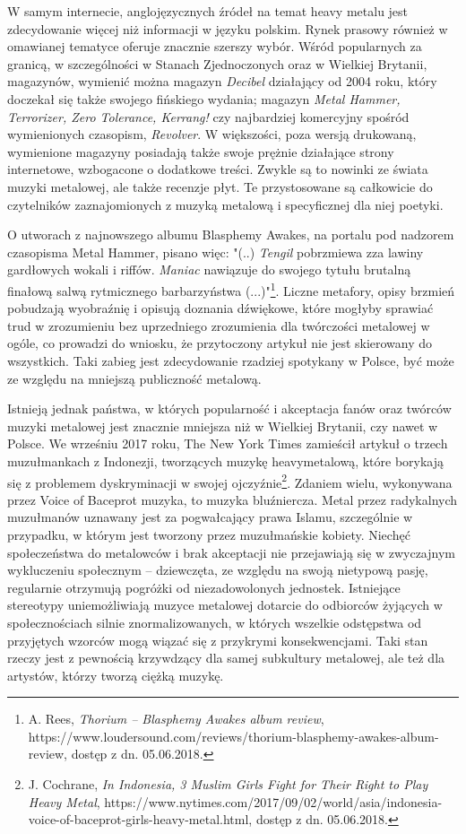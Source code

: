 \documentclass[12pt, a4paper, titlepage]{report}
\begin{document}
W samym internecie, anglojęzycznych źródeł na temat heavy metalu jest zdecydowanie więcej niż informacji w języku polskim. Rynek prasowy również w omawianej tematyce oferuje znacznie szerszy wybór. Wśród popularnych za granicą, w szczególności w Stanach Zjednoczonych oraz w Wielkiej Brytanii, magazynów, wymienić można magazyn \textit{Decibel} działający od 2004 roku, który doczekał się także swojego fińskiego wydania; magazyn \textit{Metal Hammer, Terrorizer, Zero Tolerance, Kerrang!} czy najbardziej komercyjny spośród wymienionych czasopism, \textit{Revolver}. W większości, poza wersją drukowaną, wymienione magazyny posiadają także swoje prężnie działające strony internetowe, wzbogacone o dodatkowe treści. Zwykle są to nowinki ze świata muzyki metalowej, ale także recenzje płyt. Te przystosowane są całkowicie do czytelników zaznajomionych z muzyką metalową i specyficznej dla niej poetyki. 

O utworach z najnowszego albumu Blasphemy Awakes, na portalu pod nadzorem czasopisma Metal Hammer, pisano więc: "(..) \textit{Tengil} pobrzmiewa zza lawiny gardłowych wokali i riffów. \textit{Maniac} nawiązuje do swojego tytułu brutalną finałową salwą rytmicznego barbarzyństwa (...)"\footnote{A. Rees, \textit{Thorium – Blasphemy Awakes album review}, https://www.loudersound.com/reviews/thorium-blasphemy-awakes-album-review, dostęp z dn. 05.06.2018.}. Liczne metafory, opisy brzmień pobudzają wyobraźnię i opisują doznania dźwiękowe, które mogłyby sprawiać trud w zrozumieniu bez uprzedniego zrozumienia dla twórczości metalowej w ogóle, co prowadzi do wniosku, że przytoczony artykuł nie jest skierowany do wszystkich. Taki zabieg jest zdecydowanie rzadziej spotykany w Polsce, być może ze względu na mniejszą publiczność metalową.

Istnieją jednak państwa, w których popularność i akceptacja fanów oraz twórców muzyki metalowej jest znacznie mniejsza niż w Wielkiej Brytanii, czy nawet w Polsce. We wrześniu 2017 roku, The New York Times zamieścił artykuł o trzech muzułmankach z Indonezji, tworzących muzykę heavymetalową, które borykają się z problemem dyskryminacji w swojej ojczyźnie\footnote{J. Cochrane, \textit{In Indonesia, 3 Muslim Girls Fight for Their Right to Play Heavy Metal}, https://www.nytimes.com/2017/09/02/world/asia/indonesia-voice-of-baceprot-girls-heavy-metal.html, dostęp z dn. 05.06.2018.}. Zdaniem wielu, wykonywana przez Voice of Baceprot muzyka, to muzyka bluźniercza. Metal przez radykalnych muzułmanów uznawany jest za pogwałcający prawa Islamu, szczególnie w przypadku, w którym jest tworzony przez muzułmańskie kobiety. Niechęć społeczeństwa do metalowców i brak akceptacji nie przejawiają się w zwyczajnym wykluczeniu społecznym -- dziewczęta, ze względu na swoją nietypową pasję, regularnie otrzymują pogróżki od niezadowolonych jednostek. Istniejące stereotypy uniemożliwiają muzyce metalowej dotarcie do odbiorców żyjących w społecznościach silnie znormalizowanych, w których wszelkie odstępstwa od przyjętych wzorców mogą wiązać się z przykrymi konsekwencjami. Taki stan rzeczy jest z pewnością krzywdzący dla samej subkultury metalowej, ale też dla artystów, którzy tworzą ciężką muzykę. 
\end{document}
